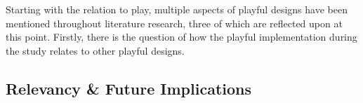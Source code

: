 Starting with the relation to play, multiple aspects of playful designs have been mentioned throughout literature research, three of which are reflected upon at this point. Firstly, there is the question of how the playful implementation during the study relates to other playful designs.







\subsection{Relevancy \& Future Implications}

% 
% 
% 
% 
% 
% 
% 

